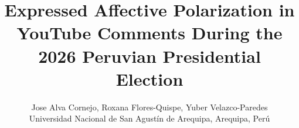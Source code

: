 \documentclass[conference, letterpaper]{IEEEtran}
\begin{document}
%
\title{Expressed Affective Polarization in YouTube Comments During the 2026 Peruvian Presidential Election}


\makeatletter
\newcommand{\linebreakand}{
  \end{@IEEEauthorhalign}
  \hfill\mbox{}\par
  \mbox{}\hfill\begin{@IEEEauthorhalign}
}
\makeatother
\author{
    Jose Alva Cornejo, Roxana Flores-Quispe, Yuber Velazco-Paredes\\
    Universidad Nacional de San Agustín de Arequipa, Arequipa, Perú\\
}





% 




\end{document}
